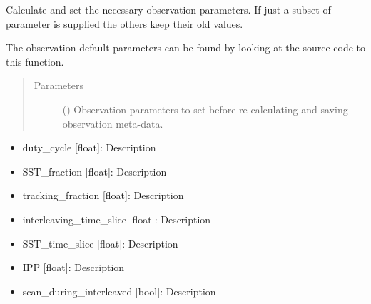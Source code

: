 \documentclass[letterpaper,10pt,english]{sphinxmanual}
\begin{document}
\begin{fulllineitems}

\begin{fulllineitems}
\label{\detokenize{modules/simulation:simulation.Simulation.maintain_discovered}}
\end{fulllineitems}


\begin{fulllineitems}
\label{\detokenize{modules/simulation:simulation.Simulation.observation_parameters}}
Calculate and set the necessary observation parameters. If just a subset of parameter is supplied the others keep their old values.

The observation default parameters can be found by looking at the source code to this function.
\begin{quote}\begin{description}
\item[{Parameters}] \leavevmode
{} () \textendash{} Observation parameters to set before re-calculating and saving observation meta-data.

\end{description}\end{quote}

\begin{itemize}
\item {} 
duty\_cycle {[}float{]}: Description

\item {} 
SST\_fraction {[}float{]}: Description

\item {} 
tracking\_fraction {[}float{]}: Description

\item {} 
interleaving\_time\_slice {[}float{]}: Description

\item {} 
SST\_time\_slice {[}float{]}: Description

\item {} 
IPP {[}float{]}: Description

\item {} 
scan\_during\_interleaved {[}bool{]}: Description


\end{itemize}
\end{fulllineitems}
\end{fulllineitems}
\end{document}
